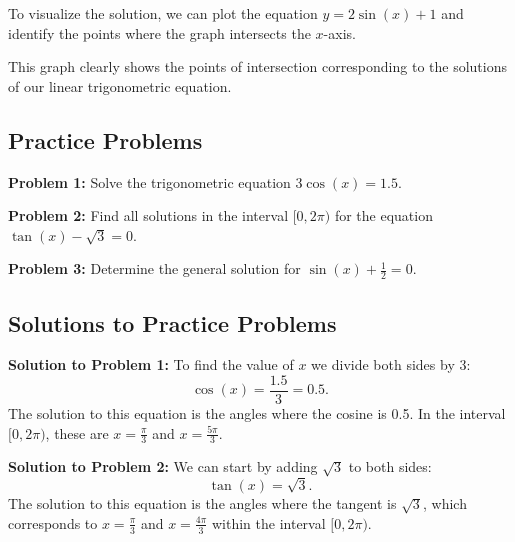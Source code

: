 \documentclass[a4paper,12pt]{book}
\newcounter{problem}
\begin{document}
To visualize the solution, we can plot the equation \( y = 2\sin(x) + 1 \) and identify the points where the graph intersects the \( x \)-axis.

\begin{center}
\end{center}

This graph clearly shows the points of intersection corresponding to the solutions of our linear trigonometric equation.


\subsection{Practice Problems}
\label{subsec:practice_problems_linear_trig}

\textbf{Problem 1:} Solve the trigonometric equation \( 3\cos(x) = 1.5 \).

\textbf{Problem 2:} Find all solutions in the interval \( [0, 2\pi) \) for the equation \( \tan(x) - \sqrt{3} = 0 \).

\textbf{Problem 3:} Determine the general solution for \( \sin(x) + \frac{1}{2} = 0 \).

\subsection{Solutions to Practice Problems}
\label{subsec:solutions_practice_problems}

\textbf{Solution to Problem 1:} To find the value of \( x \) we divide both sides by 3:
\[
\cos(x) = \frac{1.5}{3} = 0.5.
\]
The solution to this equation is the angles where the cosine is 0.5. In the interval \( [0, 2\pi) \), these are \( x = \frac{\pi}{3} \) and \( x = \frac{5\pi}{3} \).

\textbf{Solution to Problem 2:} We can start by adding \( \sqrt{3} \) to both sides:
\[
\tan(x) = \sqrt{3}.
\]
The solution to this equation is the angles where the tangent is \( \sqrt{3} \), which corresponds to \( x = \frac{\pi}{3} \) and \( x = \frac{4\pi}{3} \) within the interval \( [0, 2\pi) \).
\end{document}
